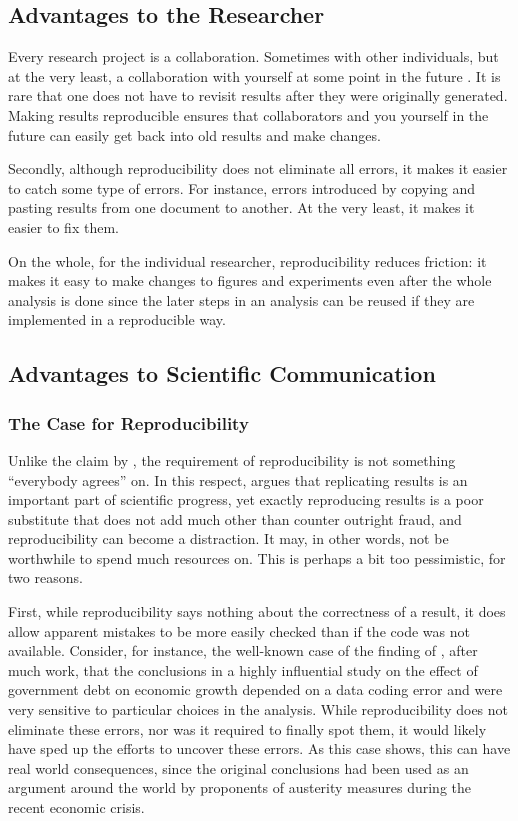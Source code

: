 \documentclass[twoside]{memoir}\usepackage[]{graphicx}\usepackage{xcolor}
\renewcommand{\cite}{\citep}
\begin{document}
\subsection{Advantages to the Researcher}
Every research project is a collaboration. Sometimes with other individuals, but at the very least, a collaboration with yourself at some point in the future \cite[Ch. 13]{Donoho2009,Wickham2015}. It is rare that one does not have to revisit results after they were originally generated. Making results reproducible ensures that collaborators and you yourself in the future can easily get back into old results and make changes.

Secondly, although reproducibility does not eliminate all errors, it makes it easier to catch some type of errors. For instance, errors introduced by copying and pasting results from one document to another. At the very least, it makes it easier to fix them.

On the whole, for the individual researcher, reproducibility reduces friction: it makes it easy to make changes to figures and experiments even after the whole analysis is done since the later steps in an analysis can be reused if they are implemented in a reproducible way.

\subsection{Advantages to Scientific Communication}

\subsubsection{The Case for Reproducibility}
Unlike the claim by \citet{Patil2016}, the requirement of reproducibility is not something ``everybody agrees'' on. In this respect, \citet{Drummond2009}  argues that replicating results is an important part of scientific progress, yet exactly reproducing results is a poor substitute that does not add much other than counter outright fraud, and reproducibility can become a distraction. It may, in other words, not be worthwhile to spend much resources on. This is perhaps a bit too pessimistic, for two reasons. 

First, while reproducibility says nothing about the correctness of a result, it does allow apparent mistakes to be more easily checked than if the code was not available. Consider, for instance, the well-known case of the finding of \citet{Herndon2014}, after much work, that the conclusions in a highly influential study on the effect of government debt on economic growth depended on a data coding error and were very sensitive to particular choices in the analysis. While reproducibility does not eliminate these errors, nor was it required to finally spot them, it would likely have sped up the efforts to uncover these errors. As this case shows, this can have real world consequences, since the original conclusions had been used as an argument around the world by proponents of austerity measures during the recent economic crisis.
\end{document}
